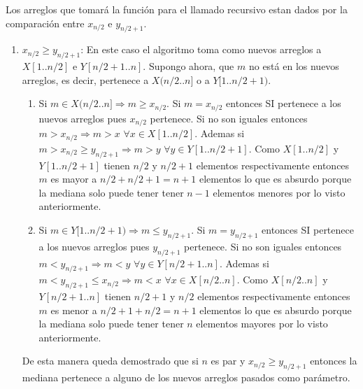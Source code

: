 \documentclass[a4paper,11pt] {article}
\begin{document}
\begin{enumerate}
Los arreglos que tomar\'a la funci\'on para el llamado recursivo estan dados por la comparaci\'on entre $x_{n/2}$ e $y_{n/2+1}$.
\begin{enumerate}
\item $x_{n/2}\geq y_{n/2+1}$:
En este caso el algoritmo toma como nuevos arreglos a $X[1..n/2]$ e $Y[n/2+1..n]$. Supongo ahora, que $m$ no est\'a en los nuevos arreglos, es decir, pertenece a $X(n/2..n]$ o a $Y[1..n/2+1)$. 
\begin{enumerate}
\item
 Si $m \in X(n/2..n] \Longrightarrow m \geq x_{n/2}$. Si $m=x_{n/2}$ entonces SI pertenece a los nuevos arreglos pues $x_{n/2}$ pertenece. Si no son iguales entonces $m>x_{n/2} \Longrightarrow m>x \,\,\forall x \in X[1..n/2]$. Ademas si $m>x_{n/2}\geq y_{n/2+1} \Longrightarrow m>y \,\,\forall y \in Y[1..n/2+1]$. Como $X[1..n/2]$ y $Y[1..n/2+1]$ tienen $n/2$ y $n/2+1$ elementos respectivamente entonces $m$ es mayor a $n/2+n/2+1=n+1$ elementos lo que es absurdo porque la mediana solo puede tener tener $n-1$ elementos menores por lo visto anteriormente.
\item
  Si $m \in Y[1..n/2+1) \Longrightarrow m \leq y_{n/2+1}$. Si $m=y_{n/2+1}$ entonces SI pertenece a los nuevos arreglos pues $y_{n/2+1}$ pertenece. Si no son iguales entonces $m<y_{n/2+1} \Longrightarrow m<y \,\,\forall y \in Y[n/2+1..n]$. Ademas si $m<y_{n/2+1}\leq x_{n/2} \Longrightarrow m<x \,\,\forall x \in X[n/2..n]$. Como $X[n/2..n]$ y $Y[n/2+1..n]$ tienen $n/2+1$ y $n/2$ elementos respectivamente entonces $m$ es menor a $n/2+1+n/2=n+1$ elementos lo que es absurdo porque la mediana solo puede tener tener $n$ elementos mayores por lo visto anteriormente.
\end{enumerate}

De esta manera queda demostrado que si $n$ es par y $x_{n/2}\geq y_{n/2+1}$ entonces la mediana pertenece a alguno de los nuevos arreglos pasados como par\'ametro.



\end{enumerate}
\end{enumerate}
\end{document}
